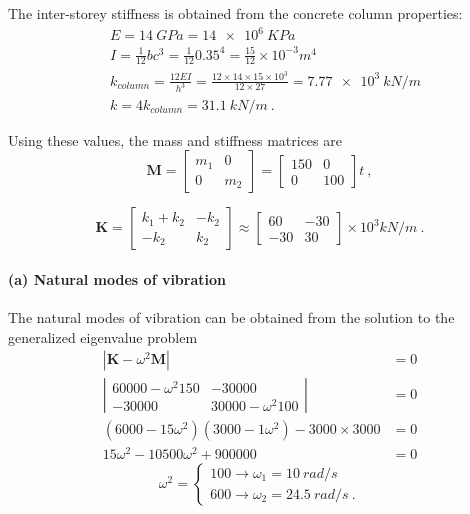 \begin{Answer}[ref={two_storey}]
The inter-storey stiffness is obtained from the concrete column properties:
\begin{align*}
&E = \SI{14}{GPa} = \SI{14e6}{KPa} \\
&I = \frac{1}{12}bc^3 = \frac{1}{12}0.35^4 = \frac{15}{12}\times10^{-3}\si{m^4} \\
&k_{column} = \frac{12EI}{h^3} = \frac{12\times14\times15\times10^3}{12\times27} = \SI{7.77e3}{kN/m} \\
&k = 4k_{column} = \SI{31.1}{kN/m}\ .
\end{align*}

Using these values, the mass and stiffness matrices are
$$
\mathbf{M} =
\begin{bmatrix}
    m_1 & 0 \\
    0 & m_2
\end{bmatrix} =
\begin{bmatrix}
    150 & 0 \\
    0 & 100
\end{bmatrix} \si{t}\ ,
$$

$$
\mathbf{K} =
\begin{bmatrix}
    k_1 + k_2 & -k_2\\
    -k_2 & k_2
\end{bmatrix} \approx
\begin{bmatrix}
    60 & -30 \\
    -30 & 30
\end{bmatrix} \times10^3 \si{kN/m}\ .
$$

\paragraph{(a) Natural modes of vibration}
The natural modes of vibration can be obtained from the solution to the generalized eigenvalue problem
\begin{align*}
|\mathbf{K} - \omega^2 \mathbf{M}| &= 0 \\
\left\vert \begin{matrix}
    60000 -\omega^2 150 & -30000 \\
    -30000 & 30000 -\omega^2 100
\end{matrix} \right\vert &= 0 \\
(6000-15\omega^2)(3000-1\omega^2)-3000\times3000 &= 0 \\
15\omega^2 - 10500\omega^2 + 900000 &= 0
\end{align*}
$$
\omega^2 = \begin{cases}
    100 \rightarrow \omega_1 = \SI{10}{rad/s} \\
    600 \rightarrow \omega_2 = \SI{24.5}{rad/s}\ .
\end{cases}
$$


\end{Answer}
